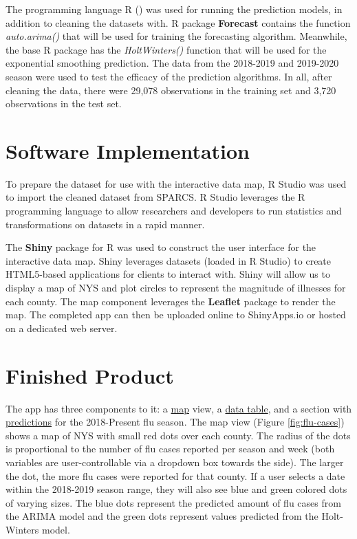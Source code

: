 \documentclass[12pt]{article}
\begin{document}
The programming language R (\citeyear{rlanguage}) was used for running the prediction models, in addition to cleaning the datasets with. R package \textbf{Forecast} \citep{forecast} contains the function \textit{auto.arima()} that will be used for training the forecasting algorithm. Meanwhile, the base R package has the \textit{HoltWinters()} function that will be used for the exponential smoothing prediction. The data from the 2018-2019 and 2019-2020 season were used to test the efficacy of the prediction algorithms. In all, after cleaning the data, there were 29,078 observations in the training set and 3,720 observations in the test set.

\section{Software Implementation}

To prepare the dataset for use with the interactive data map, R Studio was used to import the cleaned dataset from SPARCS. R Studio leverages the R programming language to allow researchers and developers to run statistics and transformations on datasets in a rapid manner.

The \textbf{Shiny} package \citep{shiny} for R was used to construct the user interface for the interactive data map. Shiny leverages datasets (loaded in R Studio) to create HTML5-based applications for clients to interact with. Shiny will allow us to display a map of NYS and plot circles to represent the magnitude of illnesses for each county. The map component leverages the \textbf{Leaflet} package \citep{leaflet} to render the map. The completed app can then be uploaded online to ShinyApps.io or hosted on a dedicated web server. 

\section{Finished Product}

The app has three components to it: a \underline{map} view, a \underline{data table}, and a section with \underline{predictions} for the 2018-Present flu season. The map view (Figure \ref{fig:flu-cases}) shows a map of NYS with small red dots over each county. The radius of the dots is proportional to the number of flu cases reported per season and week (both variables are user-controllable via a dropdown box towards the side). The larger the dot, the more flu cases were reported for that county. If a user selects a date within the 2018-2019 season range, they will also see blue and green colored dots of varying sizes. The blue dots represent the predicted amount of flu cases from the ARIMA model and the green dots represent values predicted from the Holt-Winters model. 
\end{document}
